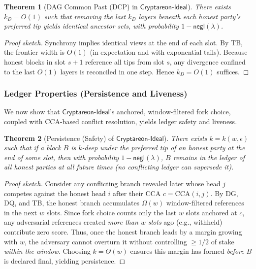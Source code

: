\documentclass[11pt]{article}
\newtheorem{theorem}{Theorem}[section]
\newcommand{\ProjIdeal}{\ensuremath{\mathsf{Cryptareon\text{-}Ideal}}\xspace}
\newcommand{\negl}{\ensuremath{\mathsf{negl}}\xspace}
\newcommand{\CCA}{\ensuremath{\mathrm{CCA}}\xspace}
\begin{document}
\begin{theorem}[DAG Common Past (DCP) in \ProjIdeal]
\label{thm:ideal-DCP}
There exists $k_D=O(1)$ such that removing the last $k_D$ layers beneath each honest party's preferred tip yields identical ancestor sets, with probability $1-\negl(\lambda)$.
\end{theorem}
\begin{proof}[Proof sketch]
Synchrony implies identical views at the end of each slot. By TB, the frontier width is $O(1)$ (in expectation and with exponential tails). Because honest blocks in slot $s{+}1$ reference all tips from slot $s$, any divergence confined to the last $O(1)$ layers is reconciled in one step. Hence $k_D=O(1)$ suffices.
\end{proof}

\subsubsection{Ledger Properties (Persistence and Liveness)}
\label{subsec:ideal-ledger-props}
We now show that \ProjIdeal's anchored, window-filtered fork choice, coupled with CCA-based conflict resolution, yields ledger safety and liveness.

\begin{theorem}[Persistence (Safety) of \ProjIdeal]
\label{thm:ideal-safety}
There exists $k=k(w,\epsilon)$ such that if a block $B$ is $k$-deep under the preferred tip of an honest party at the end of some slot, then with probability $1-\negl(\lambda)$, $B$ remains in the ledger of all honest parties at all future times (no conflicting ledger can supersede it).
\end{theorem}
\begin{proof}[Proof sketch]
Consider any conflicting branch revealed later whose head $j$ competes against the honest head $i$ after their CCA $c=\CCA(i,j)$. By DG, DQ, and TB, the honest branch accumulates $\Omega(w)$ window-filtered references in the next $w$ slots. Since fork choice counts only the last $w$ slots anchored at $c$, any adversarial references created \emph{more than $w$ slots} ago (e.g., withheld) contribute zero score. Thus, once the honest branch leads by a margin growing with $w$, the adversary cannot overturn it without controlling $\ge 1/2$ of stake \emph{within the window}. Choosing $k=\Theta(w)$ ensures this margin has formed \emph{before} $B$ is declared final, yielding persistence.
\end{proof}
\end{document}
